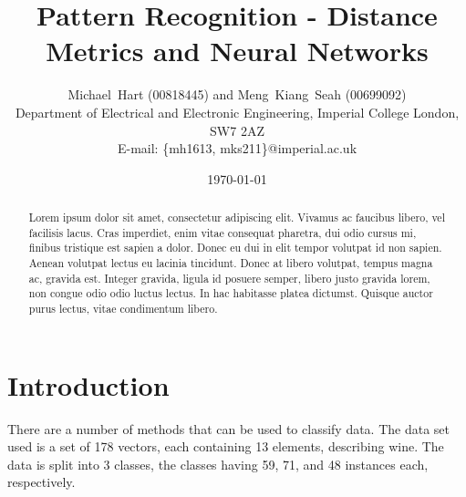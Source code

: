 \documentclass[a4paper, 10pt, conference]{ieeeconf}
\begin{document}
\title{Pattern Recognition - Distance Metrics and Neural Networks}
\author{Michael~Hart (00818445) and
        Meng~Kiang~Seah (00699092)
\\
        Department of Electrical and Electronic Engineering,
        Imperial College London,
        SW7 2AZ
\\
        E-mail: \{mh1613, mks211\}@imperial.ac.uk}
\date{\today}




\maketitle


\begin{abstract}
 Lorem ipsum dolor sit amet, consectetur adipiscing elit. Vivamus ac faucibus libero, vel facilisis lacus. Cras imperdiet, enim vitae consequat pharetra, dui odio cursus mi, finibus tristique est sapien a dolor. Donec eu dui in elit tempor volutpat id non sapien. Aenean volutpat lectus eu lacinia tincidunt. Donec at libero volutpat, tempus magna ac, gravida est. Integer gravida, ligula id posuere semper, libero justo gravida lorem, non congue odio odio luctus lectus. In hac habitasse platea dictumst. Quisque auctor purus lectus, vitae condimentum libero.
\end{abstract}

\section{Introduction}
There are a number of methods that can be used to classify data. The data set used is a set of 178 vectors, each containing 13 elements, describing wine. The data is split into 3 classes, the classes having 59, 71, and 48 instances each, respectively.
\end{document}
